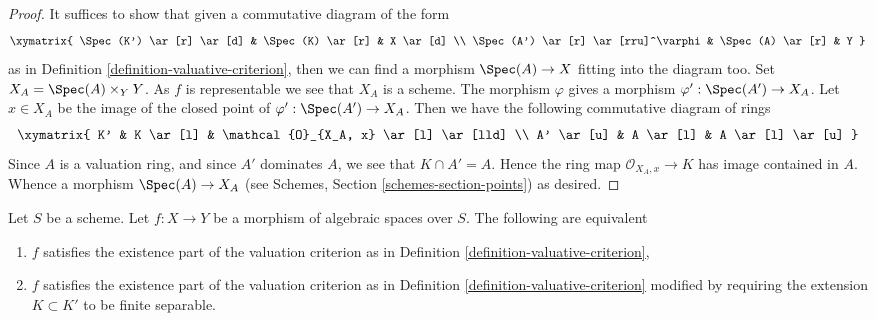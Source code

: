 \begin{proof}
It suffices to show that given a commutative diagram of the form
$$
\xymatrix{
\Spec(K') \ar[r] \ar[d] & \Spec(K) \ar[r] & X \ar[d] \\
\Spec(A') \ar[r] \ar[rru]^\varphi & \Spec(A) \ar[r] & Y
}
$$
as in Definition \ref{definition-valuative-criterion}, then we can
find a morphism $\Spec(A) \to X$ fitting into the diagram too.
Set $X_A = \Spec(A) \times_Y Y$. As $f$ is representable we see
that $X_A$ is a scheme. The morphism $\varphi$ gives a morphism
$\varphi' : \Spec(A') \to X_A$. Let $x \in X_A$ be the image of
the closed point of $\varphi' : \Spec(A') \to X_A$. Then we
have the following commutative diagram of rings
$$
\xymatrix{
K' & K \ar[l] & \mathcal{O}_{X_A, x} \ar[l] \ar[lld] \\
A' \ar[u] & A \ar[l] & A \ar[l] \ar[u]
}
$$
Since $A$ is a valuation ring, and since $A'$ dominates $A$, we see
that $K \cap A' = A$. Hence the ring map $\mathcal{O}_{X_A, x} \to K$
has image contained in $A$. Whence a morphism $\Spec(A) \to X_A$ (see
Schemes, Section \ref{schemes-section-points})
as desired.
\end{proof}

\begin{lemma}
\label{lemma-finite-separable-enough}
Let $S$ be a scheme.
Let $f : X \to Y$ be a morphism of algebraic spaces over $S$.
The following are equivalent
\begin{enumerate}
\item $f$ satisfies the existence part of the valuation criterion
as in Definition \ref{definition-valuative-criterion},
\item $f$ satisfies the existence part of the valuation criterion
as in Definition \ref{definition-valuative-criterion} modified by
requiring the extension $K \subset K'$ to be finite separable.
\end{enumerate}
\end{lemma}

